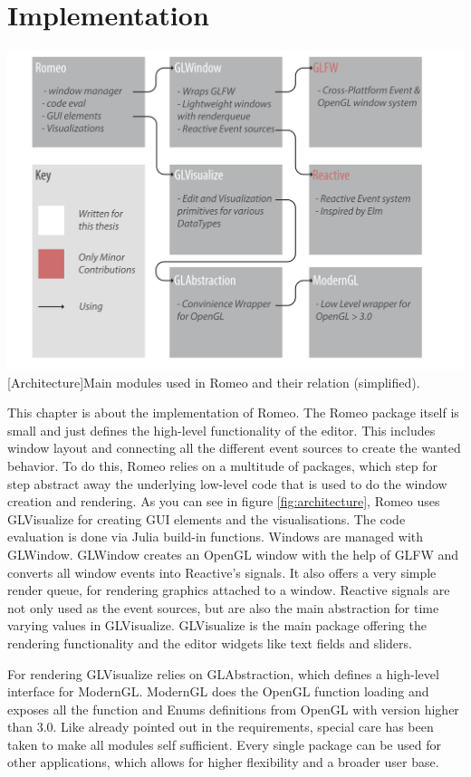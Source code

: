 \section{Implementation}

\vspace{1em}
\begin{minipage}{\linewidth}
    \centering
    \includegraphics[width=0.9\linewidth]{graphics/architecture.pdf}
    [Architecture]{Main modules used in Romeo and their relation (simplified).}
    \label{fig:architecture} 
\end{minipage}


This chapter is about the implementation of Romeo.
The Romeo package itself is small and just defines the high-level functionality of the editor.
This includes window layout and connecting all the different event sources to create the wanted behavior.
To do this, Romeo relies on a multitude of packages, which step for step abstract away the underlying low-level code that is used to do the window creation and rendering.
As you can see in figure \ref{fig:architecture}, Romeo uses GLVisualize for creating \ac{GUI} elements and the visualisations. 
The code evaluation is done via Julia build-in functions.
Windows are managed with GLWindow. GLWindow creates an OpenGL window with the help of GLFW and converts all window events into Reactive's signals. It also offers a very simple render queue, for rendering graphics attached to a window.
Reactive signals are not only used as the event sources, but are also the main abstraction for time varying values in GLVisualize.
GLVisualize is the main package offering the rendering functionality and the editor widgets like text fields and sliders.

For rendering GLVisualize relies on GLAbstraction, which defines a high-level interface for ModernGL.
ModernGL does the \ac{OpenGL} function loading and exposes all the function and Enums definitions from \ac{OpenGL} with version higher than 3.0.
Like already pointed out in the requirements, special care has been taken to make all modules self sufficient. 
Every single package can be used for other applications, which allows for higher flexibility and a broader user base.


